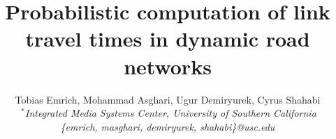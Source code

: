 \documentclass[]{sig-alternate}
\title{Probabilistic computation of link travel times in dynamic road networks}
\author{{Tobias Emrich, Mohammad Asghari, Ugur Demiryurek, Cyrus Shahabi}
  \vspace{1.6mm}\\
  \fontsize{10}{10}\selectfont\rmfamily\itshape
  $~^{*}$Integrated Media Systems Center, University of Southern California\\
  \fontsize{9}{9}\selectfont\ttfamily\upshape
  \{emrich, masghari, demiryurek, shahabi\}@usc.edu
  \vspace{-0.5cm}
}
\begin{document}
\maketitle

%

\begin{abstract}


\end{abstract}
\end{document}
